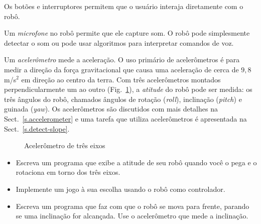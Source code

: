 Os botões e interruptores permitem que o usuário interaja diretamente com o robô.

Um \emph{microfone} no robô permite que ele capture som. O robô pode simplesmente detectar o som ou pode usar algoritmos para interpretar comandos de voz.

Um \emph{acelerômetro} mede a aceleração. O uso primário de acelerômetros é para medir a direção da força gravitacional que causa uma aceleração de cerca de $9,\!8$ m/s$^{2}$ em direção ao centro da terra. Com três acelerômetros montados perpendicularmente um ao outro (Fig.~\ref{fig.accel}), a \emph{atitude} do robô pode ser medida: os três ângulos do robô, chamados ângulos de rotação (\emph{roll}), inclinação (\emph{pitch}) e guinada (\emph{yaw}). Os acelerômetros são discutidos com mais detalhes na Sect.~\ref{s.accelerometer} e uma tarefa que utiliza acelerômetros é apresentada na Sect.~\ref{s.detect-slope}.

\begin{figure}
\begin{center}
\caption{Acelerômetro de três eixos}\label{fig.accel}
\end{center}
\end{figure}

\begin{framed}

\begin{itemize}
\item Escreva um programa que exibe a atitude de seu robô quando você o pega e o rotaciona em torno dos três eixos.

\item Implemente um jogo à sua escolha usando o robô como controlador.

\item Escreva um programa que faz com que o robô se mova para frente, parando se uma inclinação for alcançada. Use o acelerômetro que mede a inclinação.
\end{itemize}
\end{framed}

